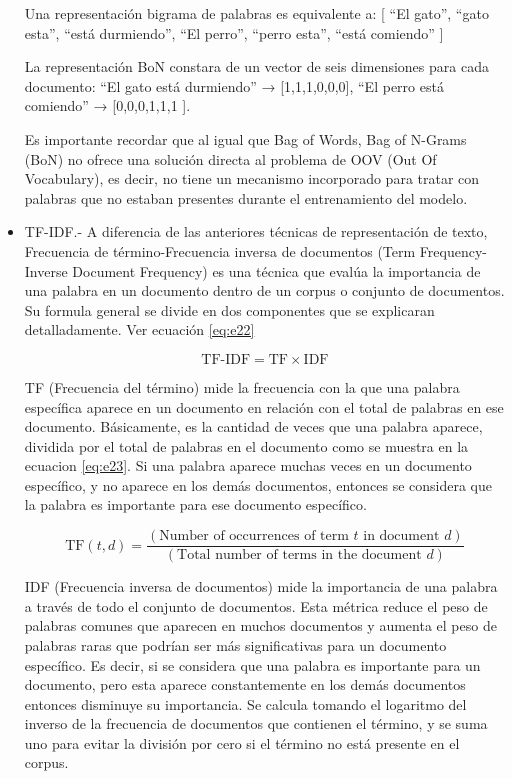 \begin{itemize}
Una representación bigrama de palabras es equivalente a:
[ ``El gato'', ``gato esta'', ``está durmiendo'', ``El perro'', ``perro esta'', ``está comiendo'' ]

La representación BoN constara de un vector de seis dimensiones para cada documento: ``El gato está durmiendo'' → [1,1,1,0,0,0], ``El perro está comiendo'' → [0,0,0,1,1,1 ].


Es importante recordar que al igual que Bag of Words, Bag of N-Grams (BoN) no ofrece una solución directa al problema de OOV (Out Of Vocabulary), es decir, no tiene un mecanismo incorporado para tratar con palabras que no estaban presentes durante el entrenamiento del modelo.


	\item TF-IDF.- A diferencia de las anteriores técnicas de representación de texto, Frecuencia de término-Frecuencia inversa de documentos (Term Frequency-Inverse Document Frequency) es una técnica que evalúa la importancia de una palabra en un documento dentro de un corpus o conjunto de documentos. Su formula general se divide en dos componentes que se explicaran detalladamente. Ver ecuación \ref{eq:e22}

\begin{equation} \label{eq:e22}
	\textrm{TF-IDF} = \textrm{TF} \times \textrm{IDF}
\end{equation}

TF (Frecuencia del término) mide la frecuencia con la que una palabra específica aparece en un documento en relación con el total de palabras en ese documento. Básicamente, es la cantidad de veces que una palabra aparece, dividida por el total de palabras en el documento como se muestra en la ecuacion \ref{eq:e23}. Si una palabra aparece muchas veces en un documento específico, y no aparece en los demás documentos, entonces se considera que la palabra es importante para ese documento específico.

\begin{equation} \label{eq:e23}
	\textrm{TF}(t,d)=\frac{(\textrm{Number of occurrences of term }t\textrm{ in document }d)}{(\textrm{Total number of terms in the document } d)}
\end{equation}

IDF (Frecuencia inversa de documentos) mide la importancia de una palabra a través de todo el conjunto de documentos. Esta métrica reduce el peso de palabras comunes que aparecen en muchos documentos y aumenta el peso de palabras raras que podrían ser más significativas para un documento específico. Es decir, si se considera que una palabra es importante para un documento, pero esta aparece constantemente en los demás documentos entonces disminuye su importancia. Se calcula tomando el logaritmo del inverso de la frecuencia de documentos que contienen el término, y se suma uno para evitar la división por cero si el término no está presente en el corpus.


\end{itemize}
